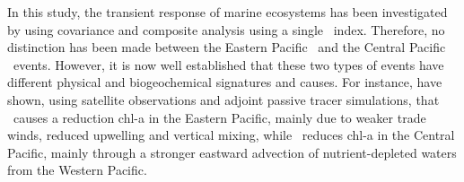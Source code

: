 In this study, the transient response of marine ecosystems has been investigated by using covariance and composite analysis using a single \nino\ index.
Therefore, no distinction has been made between the Eastern Pacific \nino\ and the Central Pacific \nino\ events. However, it is now well established that these two types of events 
have different physical and biogeochemical signatures and causes. For instance, \cite{gierachBiologicalResponse19972012} have shown, using satellite observations and adjoint passive tracer simulations, 
that \epn\ causes a reduction chl-a in the Eastern Pacific, mainly due to weaker trade winds, reduced upwelling and vertical mixing, while \cpn\ reduces chl-a in the Central Pacific, mainly through a stronger
eastward advection of nutrient-depleted waters from the Western Pacific.


